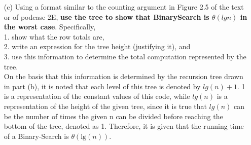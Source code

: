 \documentclass[12pt]{article}
\begin{document}
\begin{itemize}
    \item[(c)] Using a format similar to the counting argument in Figure 2.5 of the text or of podcase 2E, \textbf{use the tree to show that BinarySearch is $\theta(lgn)$ in the worst case}. Specifically, \\
    1. show what the row totals are, \\
    2. write an expression for the tree height (justifying it), and \\
    3. use this information to determine the total computation represented by the tree. \\
    
    On the basis that this information is determined by the recursion tree drawn in part (b), it is noted that each level of this tree is denoted by $lg(n) +1$.  1 is a representation of the constant values of this code,  while $lg(n)$ is a representation of the height of the given tree,  since it is true that $lg(n)$ can be the number of times the given n can be divided before reaching the bottom of the tree, denoted as 1. 
    Therefore, it is given that the running time of a Binary-Search is $\theta(\text{lg}(n))$.
   
\end{itemize}
\end{document}
